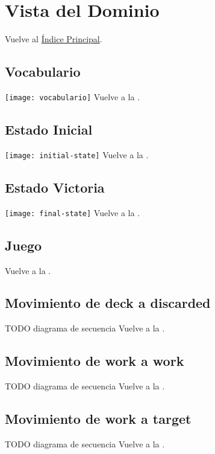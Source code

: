 \newpage{}
\section{Vista del Dominio}\label{domaintoc}

\secttoc
Vuelve al \hyperlink{toc}{Índice Principal}.

\newpage{}
\subsection{Vocabulario}
\texttt{[image: vocabulario]}
Vuelve a la .

\newpage{}
\subsection{Estado Inicial}
\texttt{[image: initial-state]}
Vuelve a la .

\newpage{}
\subsection{Estado Victoria}
\texttt{[image: final-state]}
Vuelve a la .

\newpage{}
\begin{landscape}    
\subsection{Juego}
\begin{center}
\end{center}
Vuelve a la .
\end{landscape}

\newpage{}
\subsection{Movimiento de deck a discarded}
TODO diagrama de secuencia
Vuelve a la .

\newpage{}
\subsection{Movimiento de work a work}
TODO diagrama de secuencia
Vuelve a la .

\newpage{}
\subsection{Movimiento de work a target}
TODO diagrama de secuencia
Vuelve a la .
